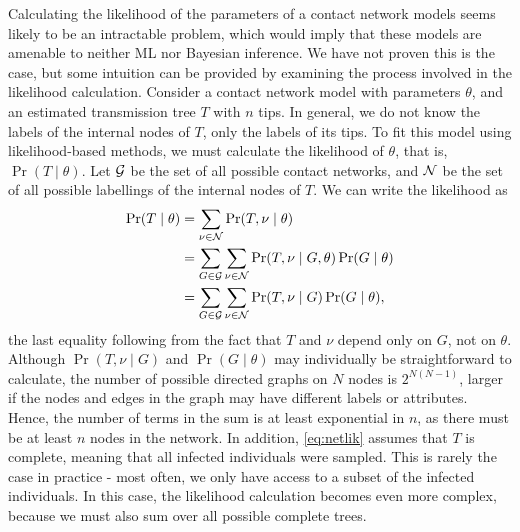 Calculating the likelihood of the parameters of a contact network models seems
likely to be an intractable problem, which would imply that these models are
amenable to neither \gls{ML} nor Bayesian inference. We have not proven this is
the case, but some intuition can be provided by examining the process involved
in the likelihood calculation. Consider a contact network model with parameters
$\theta$, and an estimated transmission tree $T$ with $n$ tips. In general, we
do not know the labels of the internal nodes of $T$, only the labels of its
tips. To fit this model using likelihood-based methods, we must calculate the
likelihood of $\theta$, that is, $\Pr(T \mid \theta)$. Let $\mathcal{G}$ be the set of
all possible contact networks, and $\mathcal{N}$ be the set of all possible labellings
of the internal nodes of $T$. We can write the likelihood as
\begin{align}
\begin{split}
  \label{eq:netlik}
  \Pr(T \mid \theta)
    &= \sum_{\nu \in \mathcal{N}} \Pr(T, \nu \mid \theta) \\
    &= \sum_{G \in \mathcal{G}} \sum_{\nu \in \mathcal{N}} \Pr(T, \nu \mid G, \theta) \Pr(G \mid \theta) \\
    &= \sum_{G \in \mathcal{G}} \sum_{\nu \in \mathcal{N}} \Pr(T, \nu \mid G) \Pr(G \mid \theta),
\end{split}
\end{align}
the last equality following from the fact that $T$ and $\nu$ depend only on
$G$, not on $\theta$. Although $\Pr(T, \nu \mid G)$ and $\Pr(G \mid \theta)$
may individually be straightforward to calculate, the number of possible
directed graphs on $N$ nodes is $2^{N(N-1)}$, larger if the nodes and edges in
the graph may have different labels or attributes. Hence, the number of terms
in the sum is at least exponential in $n$, as there must be at least $n$ nodes
in the network. In addition, \cref{eq:netlik} assumes that $T$ is complete,
meaning that all infected individuals were sampled. This is rarely the case in
practice - most often, we only have access to a subset of the infected
individuals. In this case, the likelihood calculation becomes even more
complex, because we must also sum over all possible complete trees.

